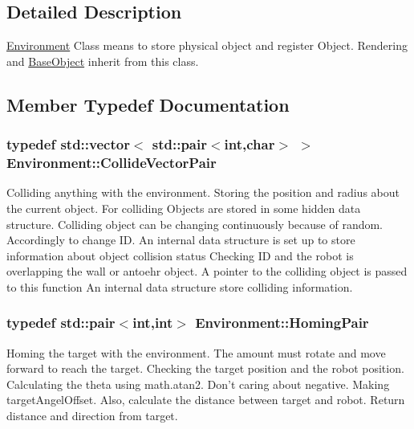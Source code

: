 \subsection{Detailed Description}
\hyperlink{classEnvironment}{Environment} Class means to store physical object and register Object. Rendering and \hyperlink{classBaseObject}{Base\-Object} inherit from this class. 

\subsection{Member Typedef Documentation}
\hypertarget{classEnvironment_a9609fedf5c7244c3515c8e5640b81e85}{
\subsubsection[{Collide\-Vector\-Pair}]{\setlength{\rightskip}{0pt plus 5cm}typedef std\-::vector$<$ std\-::pair$<$int,char$>$ $>$ {\bf Environment\-::\-Collide\-Vector\-Pair}}}\label{classEnvironment_a9609fedf5c7244c3515c8e5640b81e85}
Colliding anything with the environment. Storing the position and radius about the current object. For colliding Objects are stored in some hidden data structure. Colliding object can be changing continuously because of random. Accordingly to change I\-D. An internal data structure is set up to store information about object collision status Checking I\-D and the robot is overlapping the wall or antoehr object. A pointer to the colliding object is passed to this function An internal data structure store colliding information. \hypertarget{classEnvironment_aa0cae1577b893c94479b544518c11d3b}{
\subsubsection[{Homing\-Pair}]{\setlength{\rightskip}{0pt plus 5cm}typedef std\-::pair$<$int,int$>$ {\bf Environment\-::\-Homing\-Pair}}}\label{classEnvironment_aa0cae1577b893c94479b544518c11d3b}
Homing the target with the environment. The amount must rotate and move forward to reach the target. Checking the target position and the robot position. Calculating the theta using math.\-atan2. Don't caring about negative. Making target\-Angel\-Offset. Also, calculate the distance between target and robot. Return distance and direction from target. 

